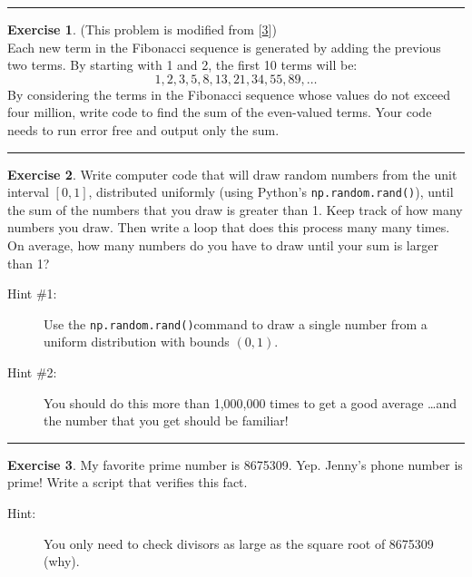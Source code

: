 \documentclass[
]{book}
\theoremstyle{definition}
\theoremstyle{definition}
\theoremstyle{definition}
\newtheorem{exercise}{Exercise}[chapter]
\theoremstyle{remark}
\begin{document}
\begin{center}\rule{0.5\linewidth}{0.5pt}\end{center}

\begin{exercise}
\protect\hypertarget{exr:unnamed-chunk-53}{}{\label{exr:unnamed-chunk-53} }(This problem is modified from {[}\protect\hyperlink{ref-euler}{3}{]})\\
Each new term in the Fibonacci sequence is generated by adding the
previous two terms. By starting with 1 and 2, the first 10 terms will
be: \[1, 2, 3, 5, 8, 13, 21, 34, 55, 89, \dots\] By considering the
terms in the Fibonacci sequence whose values do not exceed four million,
write code to find the sum of the even-valued terms. Your code needs to
run error free and output only the sum.
\end{exercise}

\begin{center}\rule{0.5\linewidth}{0.5pt}\end{center}

\begin{exercise}
\protect\hypertarget{exr:unnamed-chunk-54}{}{\label{exr:unnamed-chunk-54} }Write computer code that will draw random numbers from the unit interval
\([0,1]\), distributed uniformly (using Python's \texttt{np.random.rand()}), until the sum of the numbers that you
draw is greater than 1. Keep track of how many numbers you draw. Then
write a loop that does this process many many times. On average, how
many numbers do you have to draw until your sum is larger than 1?

\begin{description}
\item[Hint \#1:]
Use the \texttt{np.random.rand()}command to
draw a single number from a uniform distribution with bounds \((0,1)\).\\
\item[Hint \#2:]
You should do this more than 1,000,000 times to get a good
average \ldots and the number that you get should be familiar!
\end{description}
\end{exercise}

\begin{center}\rule{0.5\linewidth}{0.5pt}\end{center}

\begin{exercise}
\protect\hypertarget{exr:unnamed-chunk-55}{}{\label{exr:unnamed-chunk-55} }My favorite prime number is 8675309. Yep. Jenny's phone number is prime!
Write a script that verifies this fact.

\begin{description}
\item[Hint:]
You only need to check divisors as large as the square root of 8675309 (why).
\end{description}
\end{exercise}
\end{document}
